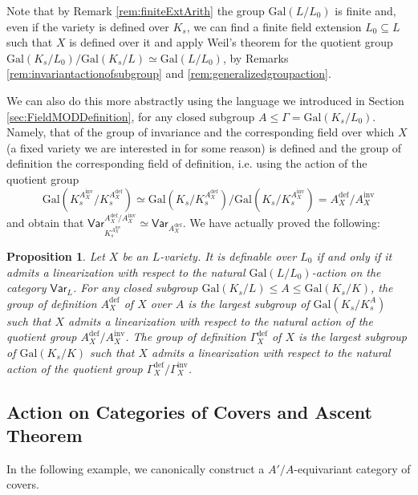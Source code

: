 \documentclass[10pt]{amsart}
\newtheorem{proposition}[theorem]{Proposition}
\theoremstyle{definition}
\newcommand{\Gal}{{ \mathrm{Gal}}}
\begin{document}
Note that by Remark \ref{rem:finiteExtArith} the group $\Gal(L/L_0)$ is finite and, even if the variety is defined over $K_s$, we can find a finite field extension $L_0 \subseteq L$ such that $X$ is defined over it and apply Weil's theorem for the quotient group $\Gal(K_s /L_0) / \Gal(K_s / L) \simeq \Gal(L/L_0)$, by Remarks \ref{rem:invariantactionofsubgroup} and \ref{rem:generalizedgroupaction}. 

We can also do this more abstractly using the language we introduced in Section \ref{sec:FieldMODDefinition}, for any closed subgroup $A \leq \mathfrak{\Gamma} = \Gal(K_s/L_0)$. Namely, that of the group of invariance and the corresponding field over which $X$ (a fixed variety we are interested in for some reason) is defined and the group of definition the corresponding field of definition, i.e. using the action of the quotient group 
\[
\Gal(K_s ^{A_X^{\mathrm{inv}}}/K_s^{A_X^{\mathrm{def}}}) \simeq \Gal(K_s/K_s^{A_X^{\mathrm{def}}}) / \Gal(K_s / K_s ^{A_X^{\mathrm{inv}}}) = A_X^{\mathrm{def}} / A_X^{\mathrm{inv}}
\]
and obtain that $\mathsf{Var}_{K_s^{A_X^{\mathrm{inv}}}}^{A_X^{\mathrm{def}} / A_X^{\mathrm{inv}}} \simeq \mathsf{Var}_{A_X^{\mathrm{def}}}$.
We have actually proved the following:
\begin{proposition}\label{prop:equivariantweildescent}
Let $X$ be an $L$-variety. It is definable over $L_0$ if and only if it admits a linearization with respect to the natural $\Gal(L/L_0)$-action on the category $\mathsf{Var}_{L}$. 
    For any closed subgroup $ \Gal(K_s/L) \leq A \leq \Gal(K_s/ K)$, the group of definition $A_X^{\mathrm{def}}$ of $X$ over $A$ is the largest subgroup of $\Gal(K_s/K_s^A)$ such that $X$ admits a linearization with respect to the natural action of the quotient group $A_X^{\mathrm{def}}/A_X^{\mathrm{inv}}$.
    The group of definition $\mathfrak{\Gamma}^{\mathrm{def}}_X$ of $X$ is the largest subgroup of $\Gal(K_s/K)$ such that $X$ admits a linearization with respect to the natural action of the quotient group $\mathfrak{\Gamma}_X^{\mathrm{def}} / \mathfrak{\Gamma}_X^{\mathrm{inv}}$.
\end{proposition}

\subsection{Action on Categories of Covers and Ascent Theorem}\label{sec:ActionOnCatTop}
In the following example, we canonically construct a $A'/A$-equivariant category of covers. 
\end{document}
